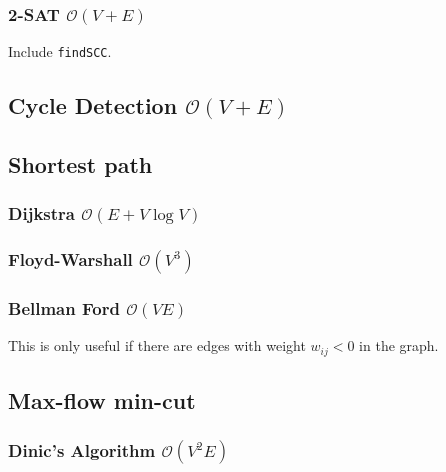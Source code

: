 \documentclass{article}
\begin{document}
\subsubsection{2-SAT $\mathcal{O}(V+E)$}

Include \texttt{findSCC}.



\subsection{Cycle Detection $\mathcal{O}(V + E)$}



\subsection{Shortest path}

\subsubsection{Dijkstra $\mathcal{O}(E + V \log V)$}

\subsubsection{Floyd-Warshall $\mathcal{O}(V^{3})$}



\subsubsection{Bellman Ford $\mathcal{O}(V E)$}

This is only useful if there are edges with weight $w_{i j} < 0$ in the graph.



\subsection{Max-flow min-cut}
\subsubsection{Dinic's Algorithm $\mathcal{O}(V^{2} E)$}
\end{document}
